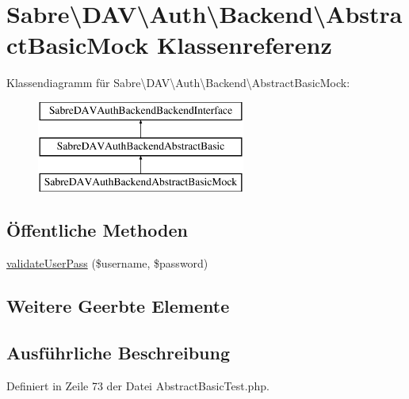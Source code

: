 \hypertarget{class_sabre_1_1_d_a_v_1_1_auth_1_1_backend_1_1_abstract_basic_mock}{}\section{Sabre\textbackslash{}D\+AV\textbackslash{}Auth\textbackslash{}Backend\textbackslash{}Abstract\+Basic\+Mock Klassenreferenz}
\label{class_sabre_1_1_d_a_v_1_1_auth_1_1_backend_1_1_abstract_basic_mock}
Klassendiagramm für Sabre\textbackslash{}D\+AV\textbackslash{}Auth\textbackslash{}Backend\textbackslash{}Abstract\+Basic\+Mock\+:\begin{figure}[H]
\begin{center}
\leavevmode
\includegraphics[height=3.000000cm]{class_sabre_1_1_d_a_v_1_1_auth_1_1_backend_1_1_abstract_basic_mock}
\end{center}
\end{figure}
\subsection*{Öffentliche Methoden}
\begin{DoxyCompactItemize}
\item 
\mbox{\hyperlink{class_sabre_1_1_d_a_v_1_1_auth_1_1_backend_1_1_abstract_basic_mock_a50a86c4445e9c82f4cf1e3bae7b2e4fd}{validate\+User\+Pass}} (\$username, \$password)
\end{DoxyCompactItemize}
\subsection*{Weitere Geerbte Elemente}


\subsection{Ausführliche Beschreibung}


Definiert in Zeile 73 der Datei Abstract\+Basic\+Test.\+php.



